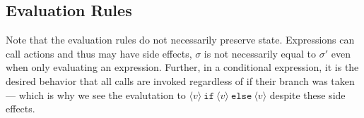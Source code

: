 \documentclass{article}
\begin{document}
\begin{multicols}{2}
    \subsection{Evaluation Rules}
    Note that the evaluation rules do not necessarily preserve state. Expressions can call actions and thus may have side effects, $\sigma$ is not necessarily equal to $\sigma'$ even when only evaluating an expression. Further, in a conditional expression, it is the desired behavior that all calls are invoked regardless of if their branch was taken --- which is why we see the evalutation to $\langle v \rangle ~\texttt{if}~ \langle v \rangle ~\texttt{else}~ \langle v \rangle$ despite these side effects.




\end{multicols}
\end{document}
